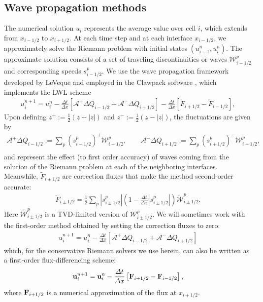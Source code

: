 \documentclass[preprint, 11pt]{article}
\newcommand{\W}{{\mathcal W}}
\newcommand{\A}{{\mathcal A}}
\newcommand{\apdq}{\A^+ \!\!{\Delta} Q}
\newcommand{\amdq}{\A^- \!\!{\Delta} Q}
\newcommand{\Ft}{\tilde{F}}
\newcommand{\imh}{{i-1/2}}
\newcommand{\iph}{{i+1/2}}
\newcommand{\bfF}{{\bf F}}
\newcommand{\bfu}{{\bf u}}
\begin{document}
\subsection{Wave propagation methods}\label{sec:waveprop}
The numerical solution $u_i$
represents the average value over cell $i$, which extends from $x_\imh$ to $x_\iph$.
At each time step and at each interface $x_\imh$, we approximately solve the
Riemann problem with initial states $(u^n_{i-1},u^n_i)$.  The approximate
solution consists of a set of traveling discontinuities or waves $\W^p_\imh$
and corresponding speeds $s^p_\imh$.
We use the wave propagation framework developed by LeVeque \cite{leveque1997wave, leveque2002finite}
and employed in the Clawpack software \cite{clawpack,pyclaw-sisc}, which implements the LWL scheme
\begin{align}\label{second-order_via_fluct}
  u_i^{n+1} = u_i^n-\frac{\Delta t}{\Delta x}\left[\apdq_\imh+\amdq_\iph\right]
  -\frac{\Delta t}{\Delta x}\left[\tilde{F}_{i+1/2}-\tilde{F}_{i-1/2}\right],
\end{align}
Upon defining $z^+:=\frac{1}{2}(z+|z|)$ and $z^-:=\frac{1}{2}(z-|z|)$,
the fluctuations are given by
\begin{align}\label{fluct}
  \apdq_\imh := \sum_p\left(s_{i-1/2}^p\right)^+\W_{i-1/2}^p, \qquad
  \amdq_\iph := \sum_p\left(s_{i+1/2}^p\right)^-\W_{i+1/2}^p, \\
\end{align}
and represent the effect (to first
order accuracy) of waves coming from the solution of the Riemann problem at
each of the neighboring interfaces.  Meanwhile, $\Ft_{i\pm 1/2}$ are correction
fluxes that make the method second-order accurate:
\begin{align*}
  \tilde{F}_{i\pm 1/2}=\frac{1}{2}\sum_p|s_{i\pm 1/2}^p|\left(1-\frac{\Delta t}{\Delta x}|s_{i\pm 1/2}^p|\right)\tilde\W_{i\pm 1/2}^p.
\end{align*}
Here $\tilde{\W}_{i\pm 1/2}^p$ is a TVD-limited version of $\W_{i\pm 1/2}^p$.
We will sometimes work with
the first-order method obtained by setting the correction fluxes to zero:
\begin{align}\label{first-order_via_fluct}
  u_i^{n+1} = u_i^n-\frac{\Delta t}{\Delta x}\left[\apdq_\imh+\amdq_\iph\right]
\end{align}
which, for the conservative Riemann solvers we use herein, can also be written
as a first-order flux-differencing scheme:
\begin{align}\label{first-order_FV}
  \bfu_i^{n+1}=\bfu_i^n-\frac{\Delta t}{\Delta x}\left[\bfF_{i+1/2}-\bfF_{i-1/2}\right],
\end{align}
where $\bfF_{i+1/2}$ is a numerical approximation of the flux at $x_\iph$.
\end{document}
